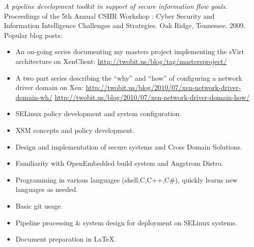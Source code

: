 \documentclass[letterpaper,11pt]{article}
\begin{document}
    {\it A pipeline development toolkit in support of secure information flow goals}.
    Proceedings of the 5th Annual CSIIR Workshop : Cyber Security and Information Intelligence Challenges and Strategies.
    Oak Ridge, Tennessee.
    2009.\\
    Popular blog posts:
    \begin {itemize}
      \setlength {\itemsep}{1pt}
      \setlength {\parskip}{0pt}
      \setlength {\parsep}{0pt}
    \item
      An on-going series documenting my masters project implementing the sVirt architecture on XenClient:
      \url{http://twobit.us/blog/tag/mastersproject/}
    \item
      A two part series describing the ``why'' and ``how'' of configuring a network driver domain on Xen:
      \url{http://twobit.us/blog/2010/07/xen-network-driver-domain-wh/}
      \url{http://twobit.us/blog/2010/07/xen-network-driver-domain-how/}
    \end {itemize}
    \begin {itemize}
      \setlength {\itemsep}{1pt}
      \setlength {\parskip}{0pt}
      \setlength {\parsep}{0pt}
      \item SELinux policy development and system configuration.
      \item XSM concepts and policy development.
      \item Design and implementation of secure systems and Cross Domain Solutions.
      \item Familiarity with OpenEmbedded build system and Angstrom Distro.
      \item Programming in various languages (shell,C,C++,C\#), quickly learns new languages as needed.
      \item Basic git usage.
      \item Pipeline processing \& system design for deployment on SELinux systems.
      \item Document preparation in \LaTeX.
    \end {itemize}
\end{document}

